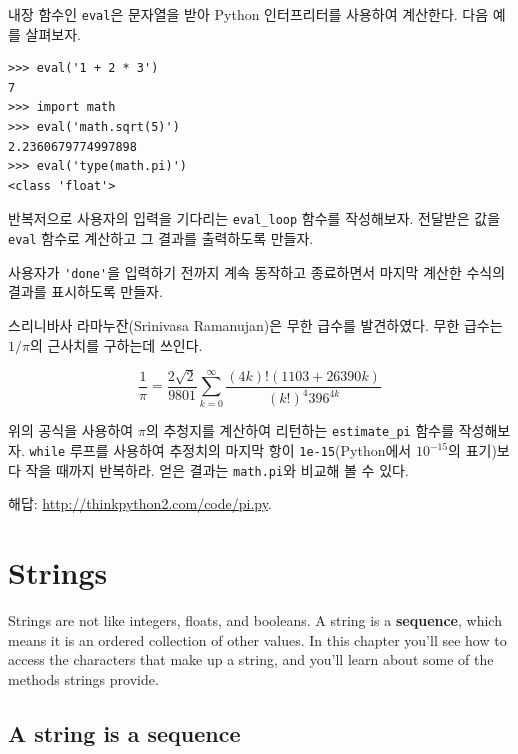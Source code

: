\documentclass[10pt]{book}
\begin{document}
\begin{exercise}

내장 함수인 {\tt eval}은 문자열을 받아 Python 인터프리터를 사용하여
계산한다.  다음 예를 살펴보자.

\begin{verbatim}
>>> eval('1 + 2 * 3')
7
>>> import math
>>> eval('math.sqrt(5)')
2.2360679774997898
>>> eval('type(math.pi)')
<class 'float'>
\end{verbatim}
%
반복저으로 사용자의 입력을 기다리는 \verb"eval_loop" 함수를
작성해보자.  전달받은 값을 {\tt eval} 함수로 계산하고 그 결과를
출력하도록 만들자.

사용자가 \verb"'done'"을 입력하기 전까지 계속 동작하고 종료하면서
마지막 계산한 수식의 결과를 표시하도록 만들자.

\end{exercise}


\begin{exercise}

스리니바사 라마누잔(Srinivasa Ramanujan)은 무한 급수를 발견하였다.
무한 급수는 $1 / \pi$의 근사치를 구하는데 쓰인다.

\[ \frac{1}{\pi} = \frac{2\sqrt{2}}{9801} 
\sum^\infty_{k=0} \frac{(4k)!(1103+26390k)}{(k!)^4 396^{4k}} \]

위의 공식을 사용하여 $\pi$의 추청지를 계산하여 리턴하는
\verb"estimate_pi" 함수를 작성해보자.  {\tt while} 루프를 사용하여
추정치의 마지막 항이 {\tt 1e-15}(Python에서 $10^{-15}$의 표기)보다 작을
때까지 반복하라.  얻은 결과는 {\tt math.pi}와 비교해 볼 수 있다.

해답: \url{http://thinkpython2.com/code/pi.py}.

\end{exercise}


\chapter{Strings}
\label{strings}

Strings are not like integers, floats, and booleans.  A string
is a {\bf sequence}, which means it is
an ordered collection of other values.  In this chapter you'll see
how to access the characters that make up a string, and you'll
learn about some of the methods strings provide.


\section{A string is a sequence}
\end{document}
